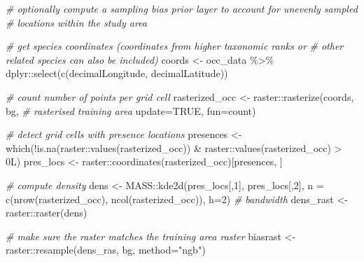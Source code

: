 \documentclass[
]{article}
\newenvironment{Shaded}{\begin{snugshade}}{\end{snugshade}}
\newcommand{\AttributeTok}[1]{\textcolor[rgb]{0.77,0.63,0.00}{#1}}
\newcommand{\CommentTok}[1]{\textcolor[rgb]{0.56,0.35,0.01}{\textit{#1}}}
\newcommand{\ConstantTok}[1]{\textcolor[rgb]{0.00,0.00,0.00}{#1}}
\newcommand{\DecValTok}[1]{\textcolor[rgb]{0.00,0.00,0.81}{#1}}
\newcommand{\FunctionTok}[1]{\textcolor[rgb]{0.00,0.00,0.00}{#1}}
\newcommand{\NormalTok}[1]{#1}
\newcommand{\OtherTok}[1]{\textcolor[rgb]{0.56,0.35,0.01}{#1}}
\newcommand{\SpecialCharTok}[1]{\textcolor[rgb]{0.00,0.00,0.00}{#1}}
\newcommand{\StringTok}[1]{\textcolor[rgb]{0.31,0.60,0.02}{#1}}
\begin{document}
\begin{Shaded}
\begin{Highlighting}[]
\CommentTok{\# optionally compute a sampling bias prior layer to account for unevenly sampled}
\CommentTok{\# locations within the study area}

\CommentTok{\# get species coordinates (coordinates from higher taxonomic ranks or }
\CommentTok{\# other related species can also be included)}
\NormalTok{coords }\OtherTok{\textless{}{-}}\NormalTok{ occ\_data }\SpecialCharTok{\%\textgreater{}\%}
\NormalTok{  dplyr}\SpecialCharTok{::}\FunctionTok{select}\NormalTok{(}\FunctionTok{c}\NormalTok{(decimalLongitude, decimalLatitude))}

\CommentTok{\# count number of points per grid cell}
\NormalTok{rasterized\_occ }\OtherTok{\textless{}{-}}\NormalTok{ raster}\SpecialCharTok{::}\FunctionTok{rasterize}\NormalTok{(coords,}
\NormalTok{                                    bg,         }\CommentTok{\# rasterised training area}
                                    \AttributeTok{update=}\ConstantTok{TRUE}\NormalTok{,}
                                    \AttributeTok{fun=}\StringTok{\textquotesingle{}count\textquotesingle{}}\NormalTok{)}

\CommentTok{\# detect grid cells with presence locations}
\NormalTok{presences }\OtherTok{\textless{}{-}} \FunctionTok{which}\NormalTok{(}\SpecialCharTok{!}\FunctionTok{is.na}\NormalTok{(raster}\SpecialCharTok{::}\FunctionTok{values}\NormalTok{(rasterized\_occ)) }\SpecialCharTok{\&}
\NormalTok{                     raster}\SpecialCharTok{::}\FunctionTok{values}\NormalTok{(rasterized\_occ) }\SpecialCharTok{\textgreater{}}\NormalTok{ 0L)}
\NormalTok{pres\_locs }\OtherTok{\textless{}{-}}\NormalTok{ raster}\SpecialCharTok{::}\FunctionTok{coordinates}\NormalTok{(rasterized\_occ)[presences, ]}

\CommentTok{\# compute density}
\NormalTok{dens }\OtherTok{\textless{}{-}}\NormalTok{ MASS}\SpecialCharTok{::}\FunctionTok{kde2d}\NormalTok{(pres\_locs[,}\DecValTok{1}\NormalTok{], pres\_locs[,}\DecValTok{2}\NormalTok{],}
                    \AttributeTok{n =} \FunctionTok{c}\NormalTok{(}\FunctionTok{nrow}\NormalTok{(rasterized\_occ), }\FunctionTok{ncol}\NormalTok{(rasterized\_occ)),}
                    \AttributeTok{h=}\DecValTok{2}\NormalTok{) }\CommentTok{\# bandwidth}
\NormalTok{dens\_rast }\OtherTok{\textless{}{-}}\NormalTok{ raster}\SpecialCharTok{::}\FunctionTok{raster}\NormalTok{(dens)}

\CommentTok{\# make sure the raster matches the training area raster}
\NormalTok{biasrast }\OtherTok{\textless{}{-}}\NormalTok{ raster}\SpecialCharTok{::}\FunctionTok{resample}\NormalTok{(dens\_ras, bg, }\AttributeTok{method=}\StringTok{"ngb"}\NormalTok{)}


\end{Highlighting}
\end{Shaded}
\end{document}
